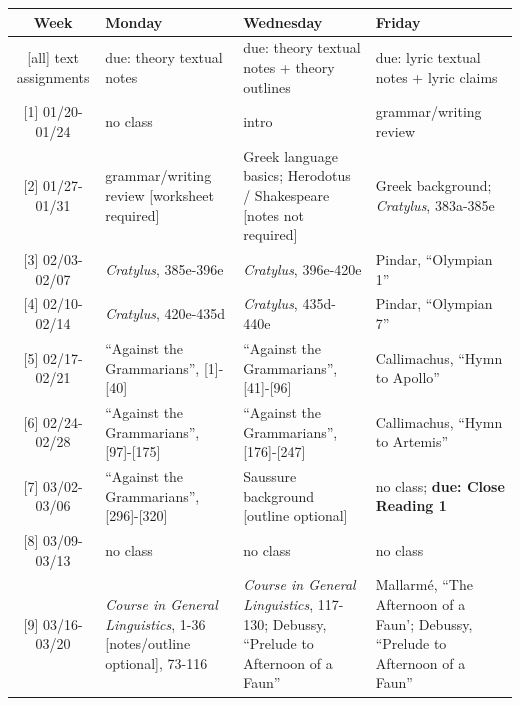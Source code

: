\documentclass[12pt]{article}
\begin{document}
\begin{center}
\begin{tabularx}{\textwidth}{| c 
 | >{\centering\arraybackslash}X 
 | >{\centering\arraybackslash}X
 | >{\centering\arraybackslash}X |}
    \hline
    \footnotesize{Week} & \footnotesize{Monday} & \footnotesize{Wednesday} & \footnotesize{Friday} \\
    \hline \hline
    \footnotesize{[all] text assignments} & \footnotesize{due: theory textual notes} & \footnotesize{due: theory textual notes + theory outlines} & \footnotesize{due: lyric textual notes + lyric claims} \\
    \hline \hline
    \footnotesize{[1] 01/20-01/24} & \footnotesize{no class} & \footnotesize{intro} & \footnotesize{grammar/writing review} \\
    \hline
    \footnotesize{[2] 01/27-01/31} & \footnotesize{grammar/writing review [worksheet required]} & \footnotesize{Greek language basics; Herodotus / Shakespeare [notes not required]} & \footnotesize{Greek background; \textit{Cratylus}, 383a-385e} \\
    \hline \hline
    \footnotesize{[3] 02/03-02/07} & \footnotesize{\textit{Cratylus}, 385e-396e} & \footnotesize{\textit{Cratylus}, 396e-420e} & \footnotesize{Pindar, ``Olympian 1''} \\
    \hline
    \footnotesize{[4] 02/10-02/14} & \footnotesize{\textit{Cratylus}, 420e-435d} & \footnotesize{\textit{Cratylus}, 435d-440e} & \footnotesize{Pindar, ``Olympian 7''} \\
    \hline \hline
    \footnotesize{[5] 02/17-02/21} & \footnotesize{``Against the Grammarians'', [1]-[40]} & \footnotesize{``Against the Grammarians'', [41]-[96]} & \footnotesize{Callimachus, ``Hymn to Apollo''} \\
    \hline
    \footnotesize{[6] 02/24-02/28} & \footnotesize{``Against the Grammarians'', [97]-[175]} & \footnotesize{``Against the Grammarians'', [176]-[247]} & \footnotesize{Callimachus, ``Hymn to Artemis''} \\
    \hline
    \footnotesize{[7] 03/02-03/06} & \footnotesize{``Against the Grammarians'', [296]-[320]} & \footnotesize{Saussure background [outline optional]} & \footnotesize{no class; \textbf{due: Close Reading 1}} \\
    \hline\hline
    \footnotesize{[8] 03/09-03/13} & \footnotesize{no class} & \footnotesize{no class} & \footnotesize{no class} \\
    \hline \hline
    \footnotesize{[9] 03/16-03/20} & \footnotesize{\textit{Course in General Linguistics}, 1-36 [notes/outline optional], 73-116} & \footnotesize{\textit{Course in General Linguistics}, 117-130; Debussy, ``Prelude to Afternoon of a Faun''} & \footnotesize{Mallarm\'{e}, ``The Afternoon of a Faun'; Debussy, ``Prelude to Afternoon of a Faun''} \\

\end{tabularx}
\end{center}
\end{document}
